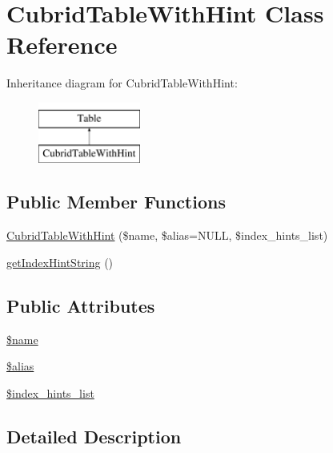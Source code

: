 \hypertarget{classCubridTableWithHint}{\section{Cubrid\-Table\-With\-Hint Class Reference}
\label{classCubridTableWithHint}
}
Inheritance diagram for Cubrid\-Table\-With\-Hint\-:\begin{figure}[H]
\begin{center}
\leavevmode
\includegraphics[height=2.000000cm]{classCubridTableWithHint}
\end{center}
\end{figure}
\subsection*{Public Member Functions}
\begin{DoxyCompactItemize}
\item 
\hyperlink{classCubridTableWithHint_a48c29472127ace98b9115e149abc664c}{Cubrid\-Table\-With\-Hint} (\$name, \$alias=N\-U\-L\-L, \$index\-\_\-hints\-\_\-list)
\item 
\hyperlink{classCubridTableWithHint_a581b44828759682ddda5ccbe7709d88b}{get\-Index\-Hint\-String} ()
\end{DoxyCompactItemize}
\subsection*{Public Attributes}
\begin{DoxyCompactItemize}
\item 
\hyperlink{classCubridTableWithHint_a29881ddda6971b68daf8719236f3b3f4}{\$name}
\item 
\hyperlink{classCubridTableWithHint_a6d3d82772e30eaaeb3f4f2cb5f137934}{\$alias}
\item 
\hyperlink{classCubridTableWithHint_abd22f208291f463ef34e7d5eeb127996}{\$index\-\_\-hints\-\_\-list}
\end{DoxyCompactItemize}


\subsection{Detailed Description}


